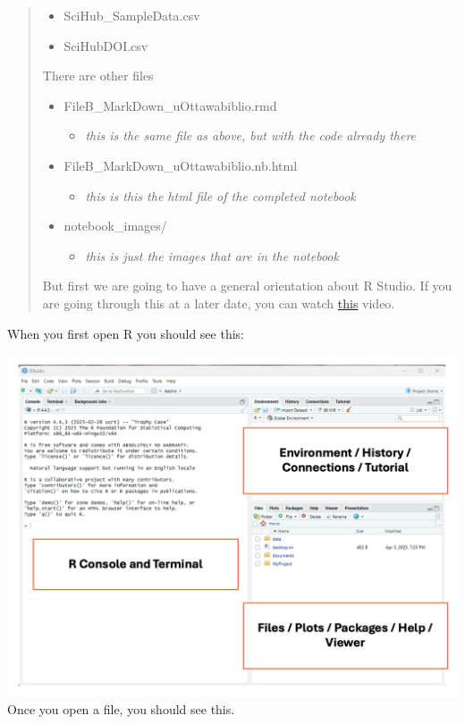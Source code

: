 \documentclass[
]{article}
\providecommand{\tightlist}{%
  \setlength{\itemsep}{0pt}\setlength{\parskip}{0pt}}
\begin{document}
\begin{quote}
\begin{itemize}
  \begin{itemize}
  \tightlist
  \item
    SciHub\_SampleData.csv\\
  \item
    SciHubDOI.csv
  \end{itemize}
\end{itemize}

There are other files

\begin{itemize}
\tightlist
\item
  FileB\_MarkDown\_uOttawabiblio.rmd

  \begin{itemize}
  \tightlist
  \item
    \emph{this is the same file as above, but with the code already
    there}\\
  \end{itemize}
\item
  FileB\_MarkDown\_uOttawabiblio.nb.html

  \begin{itemize}
  \tightlist
  \item
    \emph{this is this the html file of the completed notebook}\\
  \end{itemize}
\item
  notebook\_images/

  \begin{itemize}
  \tightlist
  \item
    \emph{this is just the images that are in the notebook}
  \end{itemize}
\end{itemize}

But first we are going to have a general orientation about R Studio. If
you are going through this at a later date, you can watch
\href{https://www.youtube.com/watch?v=FIrsOBy5k58}{this} video.
\end{quote}

When you first open R you should see this:

\includegraphics{notebook_images/R_panel.png} Once you open a file, you
should see this.
\end{document}

